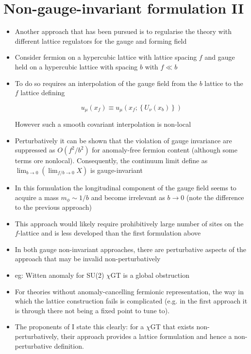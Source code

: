 \section{Non-gauge-invariant formulation II}
\begin{itemize}
  \item Another approach that has been pursued is to regularise the theory with different lattice regulators for the gauge and forming field
  \item Consider fermion on a hypercubic lattice with lattice spacing \(f\) and gauge held on a hypercubic lattice with spacing \(b\) with \(f \ll b\)
  \item To do so requires an interpolation of the gauge field from the \(b\) lattice to the \(f\) lattice defining

\begin{equation}
u_{\mu}\left(x_{f}\right) \equiv u_{\mu}\left(x_{f} ;\left\{U_{\nu}\left(x_{b}\right)\right\}\right)
\end{equation}

However such a smooth covariant interpolation is non-local

  \item Perturbatively it can be shown that the violation of gauge invariance are suppressed as \(O\left(f^{2} / b^{2}\right)\) for anomaly-free fermion content (although some terms ore nonlocal). Consequently, the continuum limit define as $\lim _{b \rightarrow 0}\left(\lim _{f / b \rightarrow 0} X\right)$  is gauge-invariant

  \item In this formulation the longitudinal component of the gauge field seems to acquire a mass \(m_{\phi} \sim 1 / b\) and become irrelevant  as \(b \rightarrow 0\) (note the difference to the previous approach)
  \item This approach would likely require prohibitively large number of sites on the $f$-lattice and is less developed than the first formulation above
  \item In both gauge non-invariant approaches, there are perturbative aspects of the approach that may be invalid non-perturbatively
  \item eg: Witten anomaly for SU(2) $\chi$GT is a global obstruction
  \item For theories without anomaly-cancelling fermionic representation, the way in which the lattice construction fails is complicated (e.g. in the first approach it is through there not being a fixed point to tune to).
  \item The proponents of I state this clearly: for a $\chi$GT  that exists non-perturbatively, their approach provides a lattice formulation and  hence a non-perturbative definition.
\end{itemize}

